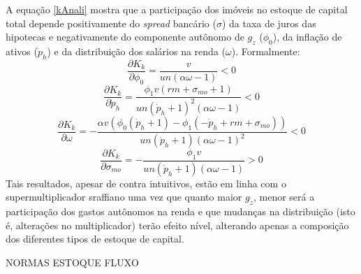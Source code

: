 A equação \ref{kAnali} mostra que a participação dos imóveis no estoque de capital total depende 
positivamente do \textit{spread} bancário ($\sigma$) da taxa de juros das hipotecas e 
negativamente do componente autônomo de $g_z$ ($\phi_0$), da inflação de ativos ($\dot p_h$) e da distribuição dos salários na renda ($\omega$). Formalmente:
\begin{equation}
\frac{\partial K_k}{\partial \phi_0} = \frac{v}{un \left(\alpha \omega - 1\right)} < 0
\end{equation}
\begin{equation}
\frac{\partial K_k}{\partial \dot p_h} = \frac{\phi_{1} v \left(rm + \sigma_{mo} + 1\right)}{un \left(\dot p_h + 1\right)^{2} \left(\alpha \omega - 1\right)} < 0
\end{equation}
\begin{equation}
\frac{\partial K_k}{\partial \omega} = - \frac{\alpha v \left(\phi_{0} \left(\dot p_h + 1\right) - \phi_{1} \left(- \dot p_h + rm + \sigma_{mo}\right)\right)}{un \left(\dot p_h + 1\right) \left(\alpha \omega - 1\right)^{2}} < 0
\end{equation}
\begin{equation}
\frac{\partial K_k}{\partial \sigma_{mo}} = - \frac{\phi_{1} v}{un \left(\dot p_h + 1\right) \left(\alpha \omega - 1\right)} > 0
\end{equation}
Tais resultados, apesar de contra intuitivos, estão em linha com o supermultiplicador sraffiano uma vez que quanto maior $g_z$, menor será a participação dos gastos autônomos na renda e que mudanças na distribuição (isto é, alterações no multiplicador) terão efeito nível, alterando apenas a composição dos diferentes tipos de estoque de capital. 


NORMAS ESTOQUE FLUXO
